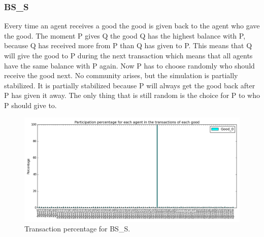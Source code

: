 \documentclass[twoside,openright]{uva-bachelor-thesis}
\begin{document}
\subsubsection{BS\_S}
Every time an agent receives a good the good is given back to the agent who gave the good. The moment P gives Q the good Q has the highest balance with P, because Q has received more from P than Q has given to P. This means that Q will give the good to P during the next transaction which means that all agents have the same balance with P again. Now P has to choose randomly who should receive the good next. No community arises, but the simulation is partially stabilized. It is partially stabilized because P will always get the good back after P has given it away. The only thing that is still random is the choice for P to who P should give to. \\
\begin{figure}[h!]
\centering
\includegraphics[scale=0.4]{Simulation_figures/BR_BS_S/Figure1_10k}
\caption{Transaction percentage for BS\_S.}
\end{figure}
\end{document}
